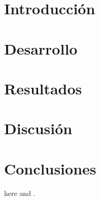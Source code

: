 \documentclass[conference]{IEEEtran}
\begin{document}

\section{Introducción}
% 

\section{Desarrollo}
% 

\section{Resultados}
% 

\section{Discusión}
% 

\section{Conclusiones}
% 

here \cite{bingul} and \cite{leonov}.



\end{document}
